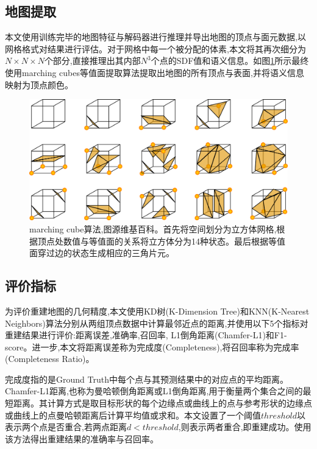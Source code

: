\subsection{地图提取}
本文使用训练完毕的地图特征与解码器进行推理并导出地图的顶点与面元数据,以网格格式对结果进行评估。对于网格中每一个被分配的体素,本文将其再次细分为$N \times N \times N$个部分,直接推理出其内部$N^3$个点的SDF值和语义信息。如图\ref{marching}所示最终使用marching cubes\cite{marchingcubes}等值面提取算法提取出地图的所有顶点与表面,并将语义信息映射为顶点颜色。
\begin{figure}[htbp]
    \centering
    \includegraphics[scale=0.7]{figures/MarchingCubes.png}
    \caption{marching cube算法,图源维基百科\cite{marchingpicture}。首先将空间划分为立方体网格,根据顶点处数值与等值面的关系将立方体分为14种状态。最后根据等值面穿过边的状态生成相应的三角片元。}\label{marching}
\end{figure}
\subsection{评价指标}\label{metric}
为评价重建地图的几何精度,本文使用KD树\cite{kd}(K-Dimension Tree)和KNN\cite{knn}(K-Nearest Neighbors)算法分别从两组顶点数据中计算最邻近点的距离,并使用以下5个指标对重建结果进行评价:距离误差,准确率,召回率, L1倒角距离(Chamfer-L1)和F1-score。进一步,本文将距离误差称为完成度(Completeness),将召回率称为完成率(Completeness Ratio)。

完成度指的是Ground Truth中每个点与其预测结果中的对应点的平均距离。Chamfer-L1距离,也称为曼哈顿倒角距离或L1倒角距离,用于衡量两个集合之间的最短距离。其计算方式是取目标形状的每个边缘点或曲线上的点与参考形状的边缘点或曲线上的点曼哈顿距离后计算平均值或求和。本文设置了一个阈值$threshold$以表示两个点是否重合,若两点距离$d<threshold$,则表示两者重合,即重建成功。使用该方法得出重建结果的准确率与召回率。

